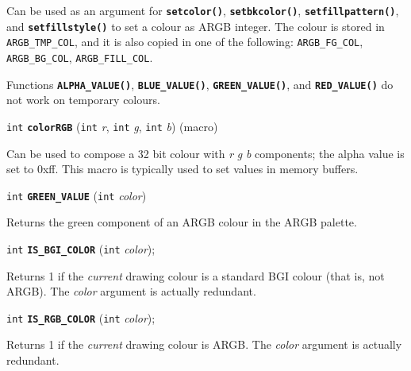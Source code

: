 \documentclass[a4paper,12pt]{article}
\newcommand{\I}{\texttt{int}}       %
\newcommand{\func}[1]{\textbf{\texttt{#1}}}  %
\newcommand{\A}[1]{\emph{#1}}       %
\newcommand{\T}[1]{\texttt{#1}}     %
\newenvironment{bgi}
{ %
  \begin{snugshade}
}
{ %
  \end{snugshade}
}
\begin{document}
Can be used as an argument for \func{setcolor()}, \func{setbkcolor()},
\func{setfillpattern()}, and \func{setfillstyle()} to set a colour as
ARGB integer. The colour is stored in \T{ARGB\_TMP\_COL}, and it is
also copied in one of the following: \T{ARGB\_FG\_COL},
\T{ARGB\_BG\_COL}, \T{ARGB\_FILL\_COL}.

Functions \func{ALPHA\_VALUE()}, \func{BLUE\_VALUE()},
\func{GREEN\_VALUE()}, and \func{RED\_VALUE()} do not work on temporary
colours.


\label{sec:colorRGB}

\begin{bgi}
\I{} \func{colorRGB} (\I{} \A{r}, \I{} \A{g}, \I{} \A{b}) (macro)
\end{bgi}

Can be used to compose a 32 bit colour with \A{r} \A{g} \A{b}
components; the alpha value is set to 0xff. This macro is typically
used to set values in memory buffers.


\label{sec:GREENVALUE}

\begin{bgi}
\I{} \func{GREEN\_VALUE} (\I{} \A{color})
\end{bgi}

Returns the green component of an ARGB colour in the ARGB palette.


\label{sec:ISBGICOLOR}

\begin{bgi}
\I{} \func{IS\_BGI\_COLOR} (\I{} \A{color});
\end{bgi}

Returns 1 if the \emph{current} drawing colour is a standard BGI
colour (that is, not ARGB). The \A{color} argument is actually redundant.


\label{sec:ISRGBCOLOR}

\begin{bgi}
\I{} \func{IS\_RGB\_COLOR} (\I{} \A{color});
\end{bgi}

Returns 1 if the \emph{current} drawing colour is ARGB. The \A{color}
argument is actually redundant.
\end{document}

